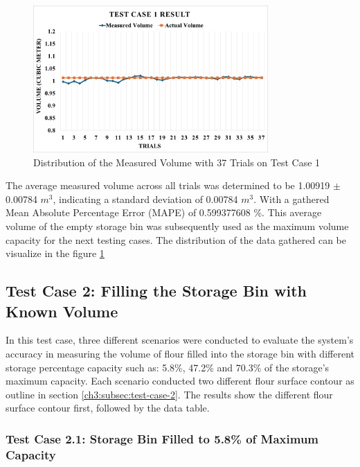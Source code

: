 \begin{figure}[H]
	\centering
	\includegraphics[width=0.8\textwidth]{Figures/test-case-1-graph}
	\caption{Distribution of the Measured Volume with 37 Trials on Test Case 1}
	\label{ch4:fig:test-case-1-graph}
\end{figure}

The average measured volume across all trials was determined to be 1.00919 $\pm$ 0.00784 $m^{3}$, indicating a standard deviation of 0.00784 $m^{3}$. With a gathered Mean Absolute Percentage Error (MAPE) of 0.599377608 \%. This average volume of the empty storage bin was subsequently used as the maximum volume capacity for the next testing cases. The distribution of the data gathered can be visualize in the figure \ref{ch4:fig:test-case-1-graph}

\subsection{Test Case 2: Filling the Storage Bin with Known Volume}

In this test case, three different scenarios were conducted to evaluate the system's accuracy in measuring the volume of flour filled into the storage bin with different storage percentage capacity such as: 5.8\%, 47.2\% and 70.3\% of the storage's maximum capacity. Each scenario conducted two different flour surface contour as outline in section \ref{ch3:subsec:test-case-2}. The results show the different flour surface contour first, followed by the data table. %

\subsubsection*{Test Case 2.1: Storage Bin Filled to 5.8\% of Maximum Capacity}

